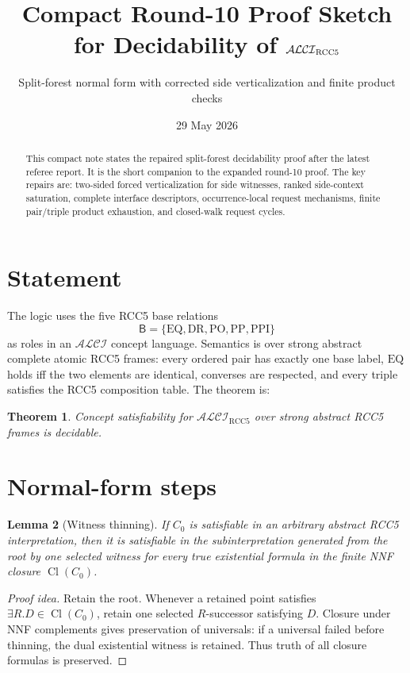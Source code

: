 \documentclass[11pt]{article}
\title{Compact Round-10 Proof Sketch for Decidability of $\Logic$}
\author{Split-forest normal form with corrected side verticalization and finite product checks}
\date{29 May 2026}
\newtheorem{theorem}{Theorem}[section]
\newtheorem{lemma}[theorem]{Lemma}
\newcommand{\Logic}{\mathcal{ALCI}_{\mathrm{RCC5}}}
\newcommand{\Cl}{\operatorname{Cl}}
\newcommand{\PP}{\mathrm{PP}}
\newcommand{\PPI}{\mathrm{PPI}}
\newcommand{\DR}{\mathrm{DR}}
\newcommand{\PO}{\mathrm{PO}}
\newcommand{\EQ}{\mathrm{EQ}}
\newcommand{\B}{\mathsf B}
\begin{document}
\maketitle

\begin{abstract}
This compact note states the repaired split-forest decidability proof after the latest referee report.  It is the short companion to the expanded round-10 proof.  The key repairs are: two-sided forced verticalization for side witnesses, ranked side-context saturation, complete interface descriptors, occurrence-local request mechanisms, finite pair/triple product exhaustion, and closed-walk request cycles.
\end{abstract}

\section{Statement}

The logic uses the five RCC5 base relations
\[
\B=\{\EQ,\DR,\PO,\PP,\PPI\}
\]
as roles in an $\mathcal{ALCI}$ concept language.  Semantics is over strong abstract complete atomic RCC5 frames: every ordered pair has exactly one base label, $\EQ$ holds iff the two elements are identical, converses are respected, and every triple satisfies the RCC5 composition table.  The theorem is:

\begin{theorem}
Concept satisfiability for $\Logic$ over strong abstract RCC5 frames is decidable.
\end{theorem}

\section{Normal-form steps}

\begin{lemma}[Witness thinning]
If $C_0$ is satisfiable in an arbitrary abstract RCC5 interpretation, then it is satisfiable in the subinterpretation generated from the root by one selected witness for every true existential formula in the finite NNF closure $\Cl(C_0)$.
\end{lemma}

\begin{proof}[Proof idea]
Retain the root.  Whenever a retained point satisfies $\exists R.D\in\Cl(C_0)$, retain one selected $R$-successor satisfying $D$.  Closure under NNF complements gives preservation of universals: if a universal failed before thinning, the dual existential witness is retained.  Thus truth of all closure formulas is preserved.
\end{proof}
\end{document}
